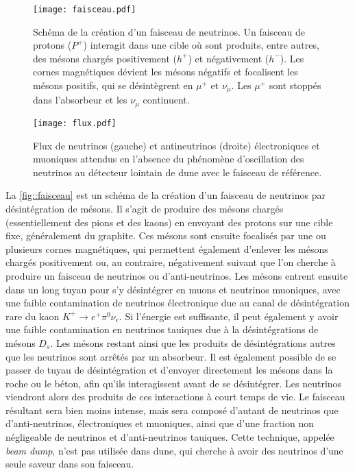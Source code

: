       \begin{figure}[htbp]
        \texttt{[image: faisceau.pdf]}
        \caption[Schéma de la création d'un faisceau de neutrinos]{\label{fig::faisceau}Schéma de la création d'un faisceau de neutrinos. Un faisceau de protons ($P^+$) interagit dans une cible où sont produits, entre autres, des mésons chargés positivement ($h^+$) et négativement ($h^-$). Les cornes magnétiques dévient les mésons négatifs et focalisent les mésons positifs, qui se désintègrent en $\mu^+$ et $\nu_{\mu}$. Les $\mu^+$ sont stoppés dans l'absorbeur et les $\nu_{\mu}$ continuent.}
      \end{figure}
      \begin{figure}[htbp]
        \texttt{[image: flux.pdf]}
        \caption[Flux de neutrinos attendus sans oscillations DU$\nu$E]{\label{fig::flux}Flux de neutrinos (gauche) et antineutrinos (droite) électroniques et muoniques attendus en l'absence du phénomène d'oscillation des neutrinos au détecteur lointain de \gls{dune} avec le faisceau de référence.}
      \end{figure}
      La \autoref{fig::faisceau} est un schéma de la création d'un faisceau de neutrinos par désintégration de mésons. Il s'agit de produire des mésons chargés (essentiellement des pions et des kaons) en envoyant des protons sur une cible fixe, généralement du graphite. Ces mésons sont ensuite focalisés par une ou plusieurs cornes magnétiques, qui permettent également d'enlever les mésons chargés positivement ou, au contraire, négativement suivant que l'on cherche à produire un faisceau de neutrinos ou d'anti-neutrinos. Les mésons entrent ensuite dans un long tuyau pour s'y désintégrer en muons et neutrinos muoniques, avec une faible contamination de neutrinos électronique due au canal de désintégration rare du kaon $K^+ \to e^+ \pi^0 \nu_e$. Si l'énergie est suffisante, il peut également y avoir une faible contamination en neutrinos tauiques due à la désintégrations de mésons $D_s$. Les mésons restant ainsi que les produits de désintégrations autres que les neutrinos sont arrêtés par un absorbeur. Il est également possible de se passer de tuyau de désintégration et d'envoyer directement les mésons dans la roche ou le béton, afin qu'ils interagissent avant de se désintégrer. Les neutrinos viendront alors des produits de ces interactions à court temps de vie. Le faisceau résultant sera bien moins intense, mais sera composé d'autant de neutrinos que d'anti-neutrinos, électroniques et muoniques, ainsi que d'une fraction non négligeable de neutrinos et d'anti-neutrinos tauiques. Cette technique, appelée \textit{beam dump}, n'est pas utilisée dans \gls{dune}, qui cherche à avoir des neutrinos d'une seule saveur dans son faisceau.
        
